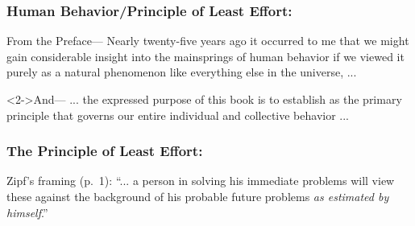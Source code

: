 \begin{frame}
  \frametitle{Human Behavior/Principle of Least Effort:}

  \begin{block}{From the Preface---}
    Nearly twenty-five years ago it occurred to me that we might gain
    considerable insight into the mainsprings of human behavior
    if we viewed it purely as a natural phenomenon like everything
    else in the universe, ...
  \end{block}

  \begin{block}<2->{And---}
    ... the expressed purpose of this book is to establish
    as the primary principle 
    that governs our entire individual and collective behavior ...
  \end{block}

\end{frame}

\begin{frame}
  \frametitle{The Principle of Least Effort:}

  \begin{block}{Zipf's framing (p.\ 1):}
    ``... a person in solving his immediate problems
    will view these against the background of his probable
    future problems \textit{as estimated by himself}.''

    \smallskip


    \smallskip


  \end{block}

\end{frame}

